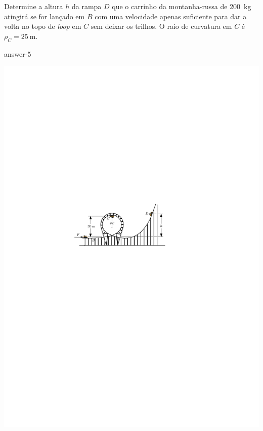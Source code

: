 \item Determine a altura $h$ da rampa $D$ que o carrinho da montanha-russa de \SI{200}{\kilogram} atingirá se for lançado em $B$ com uma velocidade apenas suficiente para dar a volta no topo de \textit{loop} em $C$ sem deixar os trilhos. O raio de curvatura em $C$ é $\rho_{C}=\SI{25}{\meter}$.

{answer-5}

\vspace{-1.5cm}
\begin{flushright}
    \includegraphics[scale=1.8]{images/draw_5.pdf}
\end{flushright}

